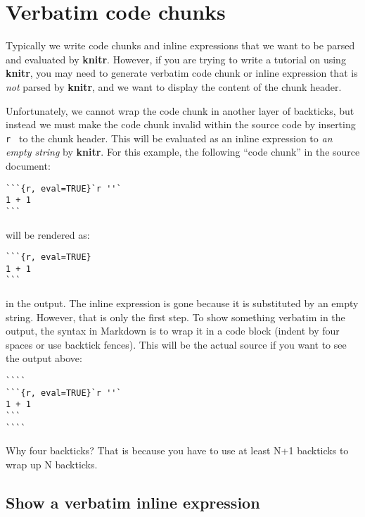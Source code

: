 \documentclass[
  11pt,
]{krantz}
\begin{document}
\hypertarget{verbatim-code-chunks}{%
\section{Verbatim code chunks}\label{verbatim-code-chunks}}

Typically we write code chunks and inline expressions that we want to be parsed and evaluated by \textbf{knitr}. However, if you are trying to write a tutorial on using \textbf{knitr}, you may need to generate verbatim code chunk or inline expression that is \emph{not} parsed by \textbf{knitr}, and we want to display the content of the chunk header.

Unfortunately, we cannot wrap the code chunk in another layer of backticks, but instead we must make the code chunk invalid within the source code by inserting \texttt{\textasciigrave{}r\ \textquotesingle{}\textquotesingle{}\textasciigrave{}} to the chunk header. This will be evaluated as an inline expression to \emph{an empty string} by \textbf{knitr}. For this example, the following ``code chunk'' in the source document:

\begin{verbatim}
```{r, eval=TRUE}`r ''`
1 + 1
```
\end{verbatim}

will be rendered as:

\begin{verbatim}
```{r, eval=TRUE}
1 + 1
```
\end{verbatim}

in the output. The inline expression is gone because it is substituted by an empty string. However, that is only the first step. To show something verbatim in the output, the syntax in Markdown is to wrap it in a code block (indent by four spaces or use backtick fences). This will be the actual source if you want to see the output above:

\begin{verbatim}
````
```{r, eval=TRUE}`r ''`
1 + 1
```
````
\end{verbatim}

Why four backticks? That is because you have to use at least N+1 backticks to wrap up N backticks.

\hypertarget{show-a-verbatim-inline-expression}{%
\subsection{Show a verbatim inline expression}\label{show-a-verbatim-inline-expression}}
\end{document}
